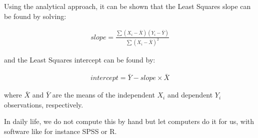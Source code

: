 \documentclass[]{book}\usepackage[]{graphicx}\usepackage[]{color}
\begin{document}
Using the analytical approach, it can be shown that the Least Squares slope can be found by solving:

\begin{eqnarray}
\label{eq:ls_slope}
slope = \frac{\sum(X_i - \bar{X})(Y_i - \bar{Y})}{\sum(X_i - \bar{X})^2}
\end{eqnarray}

and the Least Squares intercept can be found by:

\begin{eqnarray}
intercept = \bar{Y} - slope \times  \bar{X} 
\end{eqnarray}

where $\bar{X}$ and $\bar{Y}$ are the means of the independent $X_i$ and dependent $Y_i$ observations, respectively. 

In daily life, we do not compute this by hand but let computers do it for us, with software like for instance SPSS or R.
\end{document}
